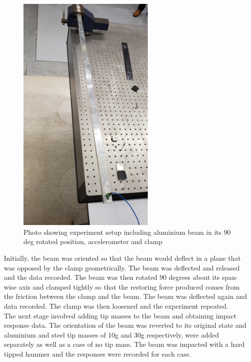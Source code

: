\documentclass[11pt]{article}
\begin{document}
\begin{figure}[H]
    \centering
    \includegraphics[width=0.6\textwidth]{setupphoto.jpg}
    \caption{Photo showing experiment setup including aluminium beam in its 90 deg rotated position, accelerometer and clamp}
    \label{fig:photo}
\end{figure}{}

Initially, the beam was oriented so that the beam would deflect in a plane that was opposed by the clamp geometrically. The beam was deflected and released and the data recorded. The beam was then rotated 90 degrees about its span-wise axis and clamped tightly so that the restoring force produced comes from the friction between the clamp and the beam. The beam was deflected again and data recorded. The clamp was then loosened and the experiment repeated. \\

The next stage involved adding tip masses to the beam and obtaining impact response data.
The orientation of the beam was reverted to its original state and aluminium and steel tip masses of 10g and 30g respectively, were added separately as well as a case of no tip mass. The beam was impacted with a hard tipped hammer and the responses were recorded for each case.
\end{document}
